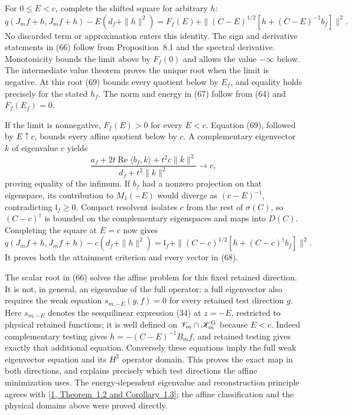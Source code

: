 \documentclass[11pt]{article}
\newcommand{\Rea}{\operatorname{Re}}
\newcommand{\KK}{\mathscr K}
\newcommand{\VV}{\mathscr V}
\begin{document}
For $0\leq E<c$, complete the shifted square for arbitrary $h$:
\begin{equation}\label{eq:affinesquare}
 q(J_mf+h,J_mf+h)-E(d_f+\|h\|^2)
 =F_f(E)+\|(C-E)^{1/2}[h+(C-E)^{-1}b_f]\|^2.
\end{equation}
No discarded term or approximation enters this identity.
The sign and derivative statements in (66) follow
from Proposition~8.1 and the spectral derivative.
Monotonicity bounds the limit above by $F_f(0)$ and allows the value
$-\infty$ below. The intermediate value theorem proves the unique
root when the limit is negative. At this root
(69) bounds every quotient below by $E_f$,
and equality holds precisely for the stated $h_f$. The norm and
energy in (67) follow from
(64) and $F_f(E_f)=0$.

If the limit is nonnegative, $F_f(E)>0$ for every $E<c$.
Equation (69), followed by $E\uparrow c$,
bounds every affine quotient below by $c$. A complementary
eigenvector $k$ of eigenvalue $c$ yields
\[
 \frac{a_f+2t\Rea\langle b_f,k\rangle+t^2c\|k\|^2}
      {d_f+t^2\|k\|^2}\longrightarrow c,
\]
proving equality of the infimum. If $b_f$ had a nonzero projection
on that eigenspace, its contribution to $M_1(-E)$ would diverge as
$(c-E)^{-1}$, contradicting $\mathfrak l_f\geq0$.
Compact resolvent isolates $c$ from the rest of $\sigma(C)$, so
$(C-c)^\dagger$ is bounded on the complementary eigenspaces and
maps into $D(C)$. Completing the square at $E=c$ now gives
\[
 q(J_mf+h,J_mf+h)-c(d_f+\|h\|^2)
 =\mathfrak l_f+
 \|(C-c)^{1/2}[h+(C-c)^\dagger b_f]\|^2 .
\]
It proves both the attainment criterion and every vector in
(68).



The scalar root in (66) solves the affine problem for
this fixed retained direction. It is not, in general, an eigenvalue of
the full operator: a full eigenvector also requires the weak equation
$s_{m,-E}(g,f)=0$ for every retained test direction $g$.
Here $s_{m,-E}$ denotes the sesquilinear expression
(34) at $z=-E$, restricted to physical retained functions;
it is well defined on $\VV_m\cap\KK_m^{\rm G}$ because $E<c$.
Indeed complementary testing gives $h=-(C-E)^{-1}B_mf$, and retained
testing gives exactly that additional equation. Conversely these
equations imply the full weak eigenvector equation and its $H^2$
operator domain. This proves the exact map in both directions, and
explains precisely which test directions the affine minimization uses.
The energy-dependent eigenvalue and reconstruction principle agrees
with \href{https://doi.org/10.4171/ECR/18-1/5}{[1, Theorem~1.2 and Corollary~1.3]}; the affine classification
and the physical domains above were proved directly.
\end{document}
